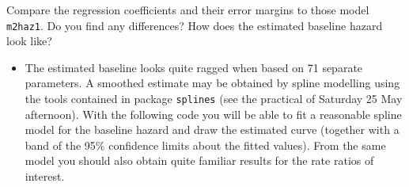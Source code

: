 \documentclass[
]{book}
\providecommand{\tightlist}{%
  \setlength{\itemsep}{0pt}\setlength{\parskip}{0pt}}
\begin{document}
Compare the regression coefficients and their error margins
to those model \texttt{m2haz1}. Do you find any differences?
How does the estimated baseline hazard look like?

\begin{itemize}
\tightlist
\item
  The estimated baseline looks quite ragged when based on 71 separate
  parameters. A smoothed estimate may be obtained by spline modelling using the tools
  contained in package \texttt{splines} (see the practical of Saturday 25 May afternoon).
  With the following code you will be able to fit a
  reasonable spline model for the baseline hazard and
  draw the estimated curve (together with a band of the 95\%
  confidence limits about the fitted values).
  From the same model you should also obtain quite familiar results for the
  rate ratios of interest.
\end{itemize}
\end{document}
